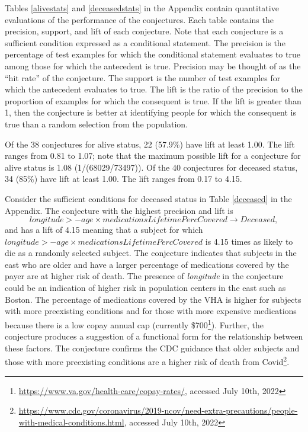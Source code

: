 \documentclass[ijds,nonblindrev]{informs-ijds}
\begin{document}
Tables \ref{alivestats} and \ref{deceasedstats} in the Appendix contain quantitative evaluations of the performance of the conjectures.  Each table contains the precision, support, and lift of each conjecture.  Note that each conjecture is a sufficient condition expressed as a conditional statement.  The precision is the percentage of test examples for which the conditional statement evaluates to true among those for which the antecedent is true.  Precision may be thought of as the ``hit rate'' of the conjecture.  The support is the number of test examples for which the antecedent evaluates to true.  The lift is the ratio of the precision to the proportion of examples for which the consequent is true.  If the lift is greater than 1, then the conjecture is better at identifying people for which the consequent is true than a random selection from the population.  

Of the 38 conjectures for alive status, 22 (57.9\%) have lift at least 1.00.  The lift ranges from 0.81 to 1.07; note that the maximum possible lift for a conjecture for alive status is 1.08 (1/(68029/73497)).  Of the 40 conjectures for deceased status, 34 (85\%) have lift at least 1.00.  The lift ranges from 0.17 to 4.15.     


Consider the sufficient conditions for deceased status in Table \ref{deceased} in the Appendix.  The conjecture with the highest precision and lift is
\[
\textit{longitude} > -\textit{age} \times \textit{medicationsLifetimePercCovered}  \rightarrow \textit{Deceased},
\]
and has a lift of 4.15 meaning that a subject for which  $\textit{longitude} > -\textit{age} \times \textit{medicationsLifetimePercCovered}$ is 4.15 times as likely to die as a randomly selected subject.  The conjecture indicates that subjects in the east who are older and have a larger percentage of medications covered by the payer are at higher risk of death.   
The presence of {\it longitude} in the conjecture could be an indication of higher risk in population centers in the east such as Boston.
The percentage of medications covered by the VHA is higher for subjects with more preexisting conditions and for those with more expensive medications because there is a low copay annual cap (currently \$700\footnote{\url{ https://www.va.gov/health-care/copay-rates/}, accessed July 10th, 2022}).
Further, the conjecture produces a suggestion of a functional form for the relationship between these factors.  
The conjecture confirms the CDC guidance that older subjects and those with more preexisting conditions are a higher risk of death from Covid\footnote{\url{https://www.cdc.gov/coronavirus/2019-ncov/need-extra-precautions/people-with-medical-conditions.html}, accessed July 10th, 2022}.  
\end{document}
